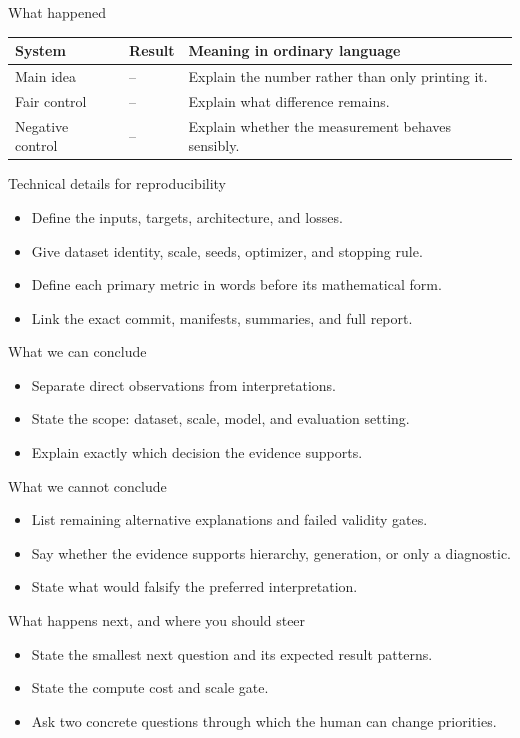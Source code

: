 \documentclass[aspectratio=169,11pt]{beamer}
\begin{document}
\begin{frame}{What happened}
  \centering
  \begin{tabular}{p{.30\linewidth}p{.22\linewidth}p{.38\linewidth}}
    \textbf{System} & \textbf{Result} & \textbf{Meaning in ordinary language}\\\hline
    Main idea & -- & Explain the number rather than only printing it.\\
    Fair control & -- & Explain what difference remains.\\
    Negative control & -- & Explain whether the measurement behaves sensibly.
  \end{tabular}
\end{frame}

\begin{frame}{Technical details for reproducibility}
  \begin{itemize}
    \item Define the inputs, targets, architecture, and losses.
    \item Give dataset identity, scale, seeds, optimizer, and stopping rule.
    \item Define each primary metric in words before its mathematical form.
    \item Link the exact commit, manifests, summaries, and full report.
  \end{itemize}
\end{frame}

\begin{frame}{What we can conclude}
  \begin{itemize}
    \item Separate direct observations from interpretations.
    \item State the scope: dataset, scale, model, and evaluation setting.
    \item Explain exactly which decision the evidence supports.
  \end{itemize}
\end{frame}

\begin{frame}{What we cannot conclude}
  \begin{itemize}
    \item List remaining alternative explanations and failed validity gates.
    \item Say whether the evidence supports hierarchy, generation, or only a diagnostic.
    \item State what would falsify the preferred interpretation.
  \end{itemize}
\end{frame}

\begin{frame}{What happens next, and where you should steer}
  \begin{itemize}
    \item State the smallest next question and its expected result patterns.
    \item State the compute cost and scale gate.
    \item Ask two concrete questions through which the human can change priorities.
  \end{itemize}
\end{frame}
\end{document}
